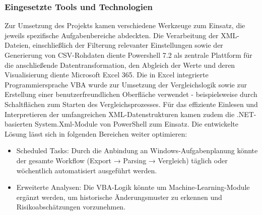 \subsubsection{Eingesetzte Tools und Technologien}
    Zur Umsetzung des Projekts kamen verschiedene Werkzeuge zum Einsatz, die jeweils spezifische Aufgabenbereiche abdeckten. Die Verarbeitung der XML-Dateien, einschließlich der Filterung relevanter Einstellungen sowie der Generierung von CSV-Rohdaten diente Powershell 7.2 als zentrale Plattform für die anschließende Datentransformation, den Abgleich der Werte und deren Visualisierung diente Microsoft Excel 365. Die in Excel integrierte Programmiersprache VBA wurde zur Umsetzung der Vergleichslogik sowie zur Erstellung einer benutzerfreundlichen Oberfläche verwendet - beispielsweise durch Schaltflächen zum Starten des Vergleichsprozesses. Für das effiziente Einlesen und Interpretieren der umfangreichen XML-Datenstrukturen kamen zudem die .NET-basierten System.Xml-Module von PowerShell zum Einsatz.
    Die entwickelte Lösung lässt sich in folgenden Bereichen weiter optimieren: 
\begin{itemize}
    \item Scheduled Tasks: 
    Durch die Anbindung an Windows-Aufgabenplanung könnte der gesamte Workflow (Export → Parsing → Vergleich) täglich oder wöchentlich automatisiert ausgeführt werden.
    \item Erweiterte Analysen:
    Die VBA-Logik könnte um Machine-Learning-Module ergänzt werden, um historische Änderungsmuster zu erkennen und Risikoabschätzungen vorzunehmen. 
\end{itemize}
